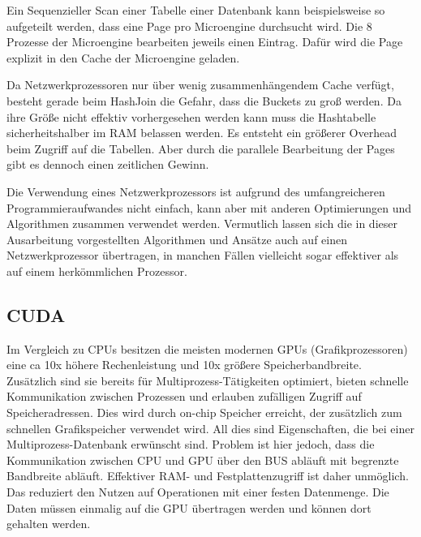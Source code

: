 Ein Sequenzieller Scan einer Tabelle einer Datenbank kann beispielsweise so aufgeteilt werden, dass eine Page pro Microengine durchsucht wird. Die 8 Prozesse der Microengine bearbeiten jeweils einen Eintrag. Dafür wird die Page explizit in den Cache der Microengine geladen.

Da Netzwerkprozessoren nur über wenig zusammenhängendem Cache verfügt, besteht gerade beim HashJoin die Gefahr, dass die Buckets zu groß werden. Da ihre Größe nicht effektiv vorhergesehen werden kann muss die Hashtabelle sicherheitshalber im RAM belassen werden. Es entsteht ein größerer Overhead beim Zugriff auf die Tabellen. Aber durch die parallele Bearbeitung der Pages gibt es dennoch einen zeitlichen Gewinn.

Die Verwendung eines Netzwerkprozessors ist aufgrund des umfangreicheren Programmieraufwandes nicht einfach, kann aber mit anderen Optimierungen und Algorithmen zusammen verwendet werden. Vermutlich lassen sich die in dieser Ausarbeitung vorgestellten Algorithmen und Ansätze auch auf einen Netzwerkprozessor übertragen, in manchen Fällen vielleicht sogar effektiver als auf einem herkömmlichen Prozessor.


\subsection{CUDA}
\label{sec:CUDA}

Im Vergleich zu CPUs besitzen die meisten modernen GPUs (Grafikprozessoren) eine ca 10x höhere Rechenleistung und 10x größere Speicherbandbreite. Zusätzlich sind sie bereits für Multiprozess-Tätigkeiten optimiert, bieten schnelle Kommunikation zwischen Prozessen und erlauben zufälligen Zugriff auf Speicheradressen. Dies wird durch on-chip Speicher erreicht, der zusätzlich zum schnellen Grafikspeicher verwendet wird. All dies sind Eigenschaften, die bei einer Multiprozess-Datenbank erwünscht sind. Problem ist hier jedoch, dass die Kommunikation zwischen CPU und GPU über den BUS abläuft mit begrenzte Bandbreite abläuft. Effektiver RAM- und Festplattenzugriff ist daher unmöglich. Das reduziert den Nutzen auf Operationen mit einer festen Datenmenge. Die Daten müssen einmalig auf die GPU übertragen werden und können dort gehalten werden.


